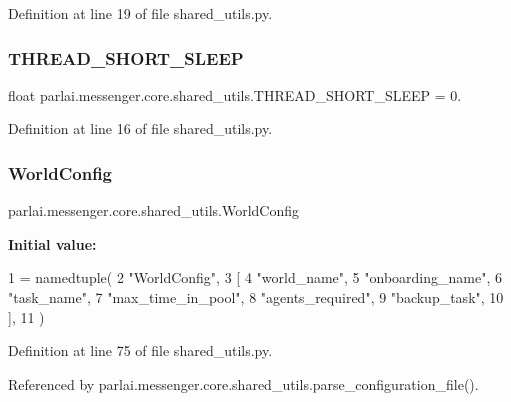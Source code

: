 Definition at line 19 of file shared\+\_\+utils.\+py.

\mbox{\label{namespaceparlai_1_1messenger_1_1core_1_1shared__utils_a816b9c6fd6f3b9a8af30b231da02d2f5}} 
\subsubsection{\texorpdfstring{T\+H\+R\+E\+A\+D\+\_\+\+S\+H\+O\+R\+T\+\_\+\+S\+L\+E\+EP}{THREAD\_SHORT\_SLEEP}}
{\footnotesize\ttfamily float parlai.\+messenger.\+core.\+shared\+\_\+utils.\+T\+H\+R\+E\+A\+D\+\_\+\+S\+H\+O\+R\+T\+\_\+\+S\+L\+E\+EP = 0.}



Definition at line 16 of file shared\+\_\+utils.\+py.

\mbox{\label{namespaceparlai_1_1messenger_1_1core_1_1shared__utils_a239b1df98babc27cadb48981864a092a}} 
\subsubsection{\texorpdfstring{World\+Config}{WorldConfig}}
{\footnotesize\ttfamily parlai.\+messenger.\+core.\+shared\+\_\+utils.\+World\+Config}

{\bfseries Initial value\+:}
\begin{DoxyCode}
1 =  namedtuple(
2     \textcolor{stringliteral}{"WorldConfig"},
3     [
4         \textcolor{stringliteral}{"world\_name"},
5         \textcolor{stringliteral}{"onboarding\_name"},
6         \textcolor{stringliteral}{"task\_name"},
7         \textcolor{stringliteral}{"max\_time\_in\_pool"},
8         \textcolor{stringliteral}{"agents\_required"},
9         \textcolor{stringliteral}{"backup\_task"},
10     ],
11 )
\end{DoxyCode}


Definition at line 75 of file shared\+\_\+utils.\+py.



Referenced by parlai.\+messenger.\+core.\+shared\+\_\+utils.\+parse\+\_\+configuration\+\_\+file().

